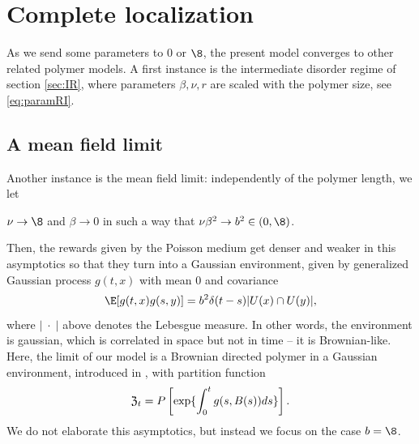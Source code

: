 



 \chapter{Complete localization}
 
As we send some parameters to 0 or $\8$, the present model converges to other related polymer models. A first instance is the intermediate disorder regime of section \ref{sec:IR},
where parameters $\beta, \nu, r$ are scaled  with the polymer size, see \eqref{eq:paramRI}.
 
\section{A mean field limit}

Another  instance is the mean field limit: independently of the polymer length, we let 
\begin{center} $\nu \to \8$ and $\beta \to 0$ in such a way that $\nu \beta^2 \to b^2 \in (0,\8)$.
\end{center}
Then, the rewards given by the Poisson medium get denser and weaker in this asymptotics so that they turn into a Gaussian environment, given by 
generalized Gaussian process $g(t,x)$ with mean 0 and covariance
$$
\E[g(t,x)g(s,y)] 
= b^2 \delta (t-s) |U(x) \cap U(y)|,
$$
where $|\;\cdot \; |$ above denotes the Lebesgue measure. In other words, the environment is gaussian, which is correlated in space but not in time -- it is Brownian-like. 
Here, the limit of our model is a Brownian directed polymer in a Gaussian environment, introduced in
\cite{RoTi05}, with partition function
$$
{\frak Z}_t= P \left[ \exp \{ \int_0^t g(s, B(s)) ds\} \right] . 
$$
We do not elaborate this asymptotics, but instead we focus on the case $b=\8$.




